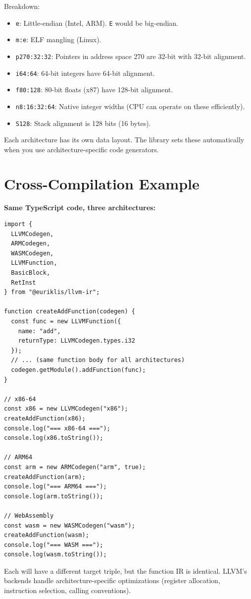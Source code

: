 \documentclass[11pt,oneside]{book}
\begin{document}
Breakdown:
\begin{itemize}[noitemsep]
  \item \texttt{e}: Little-endian (Intel, ARM). \texttt{E} would be big-endian.
  \item \texttt{m:e}: ELF mangling (Linux).
  \item \texttt{p270:32:32}: Pointers in address space 270 are 32-bit with 32-bit alignment.
  \item \texttt{i64:64}: 64-bit integers have 64-bit alignment.
  \item \texttt{f80:128}: 80-bit floats (x87) have 128-bit alignment.
  \item \texttt{n8:16:32:64}: Native integer widths (CPU can operate on these efficiently).
  \item \texttt{S128}: Stack alignment is 128 bits (16 bytes).
\end{itemize}

Each architecture has its own data layout. The library sets these automatically when you use architecture-specific code generators.

\section{Cross-Compilation Example}

\textbf{Same TypeScript code, three architectures:}

\begin{lstlisting}[style=ts]
import {
  LLVMCodegen,
  ARMCodegen,
  WASMCodegen,
  LLVMFunction,
  BasicBlock,
  RetInst
} from "@euriklis/llvm-ir";

function createAddFunction(codegen) {
  const func = new LLVMFunction({
    name: "add",
    returnType: LLVMCodegen.types.i32
  });
  // ... (same function body for all architectures)
  codegen.getModule().addFunction(func);
}

// x86-64
const x86 = new LLVMCodegen("x86");
createAddFunction(x86);
console.log("=== x86-64 ===");
console.log(x86.toString());

// ARM64
const arm = new ARMCodegen("arm", true);
createAddFunction(arm);
console.log("=== ARM64 ===");
console.log(arm.toString());

// WebAssembly
const wasm = new WASMCodegen("wasm");
createAddFunction(wasm);
console.log("=== WASM ===");
console.log(wasm.toString());
\end{lstlisting}

Each will have a different target triple, but the function IR is identical. LLVM's backends handle architecture-specific optimizations (register allocation, instruction selection, calling conventions).
\end{document}
